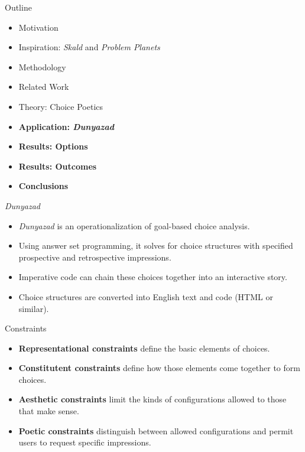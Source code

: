 \documentclass[xcolor=x11names]{beamer}
\def\dunyazad/{\textit{Dunyazad}}
\def\skald/{\textit{Skald}}
\def\problemplanets/{\textit{Problem Planets}}
\begin{document}
\begin{frame}{Outline}
  \begin{itemize}
    \item Motivation
    \item Inspiration: \skald/ and \problemplanets/
    \item Methodology
    \item Related Work
    \item Theory: Choice Poetics
    \item \textbf{Application: \dunyazad/}
    \item \textbf{Results: Options}
    \item \textbf{Results: Outcomes}
    \item \textbf{Conclusions}
  \end{itemize}
\end{frame}

\begin{frame}{\dunyazad/}
  \begin{itemize}\addtolength{\itemsep}{0.5\baselineskip}
    \item \dunyazad/ is an operationalization of goal-based choice analysis.
    \item Using answer set programming, it solves for choice structures with specified prospective and retrospective impressions.
    \item Imperative code can chain these choices together into an interactive story.
    \item Choice structures are converted into English text and code (HTML or similar).
  \end{itemize}
\end{frame}

\begin{frame}{Constraints}
  \begin{itemize}\addtolength{\itemsep}{0.5\baselineskip}
    \item \textbf{Representational constraints} define the basic elements of choices.
    \item \textbf{Constitutent constraints} define how those elements come together to form choices.
    \item \textbf{Aesthetic constraints} limit the kinds of configurations allowed to those that make sense.
    \item \textbf{Poetic constraints} distinguish between allowed configurations and permit users to request specific impressions.
  \end{itemize}
\end{frame}
\end{document}
